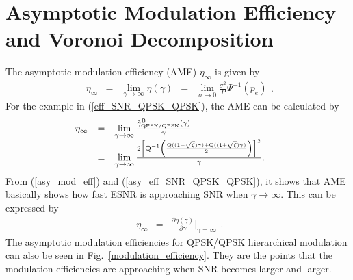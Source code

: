 \documentclass[10pt,fleqn, twocolumn]{IEEEtran}
\begin{document}
\section{Asymptotic Modulation Efficiency and Voronoi Decomposition}
The asymptotic modulation efficiency (AME) $\eta_{\infty}$ is
given by
\begin{equation}
\begin{array}{rcccl}
\eta_{\infty}&=&\lim\limits_{\gamma\rightarrow\infty}\eta\left(\gamma\right)&=&\lim\limits_{\sigma\rightarrow0}\frac{\sigma^2}{P}\Psi^{-1}\left(p_{e}\right)
\end{array}.\label{asy_mod_eff}
\end{equation}
\noindent For the example in (\ref{eff_SNR_QPSK_QPSK}), the AME
can be calculated by
\begin{equation}\hspace{-0.225in}
\begin{array}{rcl}
\eta_{\infty}&=&\lim\limits_{\gamma\rightarrow\infty}\frac{\tilde{\gamma}_{\mbox{\tiny
QPSK/QPSK}}^{\rm
B}(\gamma)}{\gamma}\\
&=&\lim\limits_{\gamma\rightarrow\infty}\frac{2\left[{\rm
Q}^{-1}\left(\frac{{\rm Q}((1-\sqrt{\zeta})\gamma)+{\rm
Q}((1+\sqrt{\zeta})\gamma)}{2}\right)\right]^2}{\gamma}.
\end{array}\label{asy_eff_SNR_QPSK_QPSK}
\end{equation}
\noindent From (\ref{asy_mod_eff}) and
(\ref{asy_eff_SNR_QPSK_QPSK}), it shows that AME basically shows
how fast ESNR is approaching SNR when $\gamma\rightarrow\infty$.
This can be expressed by
\begin{equation}
\begin{array}{rcl}
\eta_{\infty}&=&\frac{\partial\eta\left(\gamma\right)}{\partial\gamma}|_{\gamma=\infty}
\end{array}.\label{asy_mod_eff2}
\end{equation}
\noindent The asymptotic modulation efficiencies for QPSK/QPSK
hierarchical modulation can also be seen in
Fig.~\ref{modulation_efficiency}. They are the points that the
modulation efficiencies are approaching when SNR becomes larger
and larger.
\end{document}
